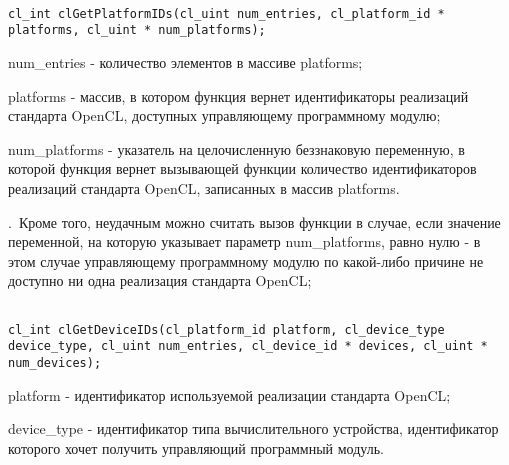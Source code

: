 	\begin{enumerate}



\begin{lstlisting}

cl_int clGetPlatformIDs(cl_uint num_entries, cl_platform_id * platforms, cl_uint * num_platforms);

\end{lstlisting}

		\openclend
		{
			\item num\_entries - количество элементов в массиве platforms;
			\item platforms - массив, в котором функция \openclfunc вернет идентификаторы реализаций стандарта OpenCL, доступных управляющему программному модулю;
			\item num\_platforms - указатель на целочисленную беззнаковую переменную, в которой функция \openclfunc вернет вызывающей функции количество идентификаторов реализаций стандарта OpenCL, записанных в массив platforms.
		}
		{\openclsuccess.~Кроме того, неудачным можно считать вызов функции \openclfunc в случае, если значение переменной, на которую указывает параметр num\_platforms, равно нулю - в этом случае управляющему программному модулю по какой-либо причине не доступно ни одна реализация стандарта OpenCL;}



\begin{lstlisting}

cl_int clGetDeviceIDs(cl_platform_id platform, cl_device_type device_type, cl_uint num_entries, cl_device_id * devices, cl_uint * num_devices);

\end{lstlisting}

		\openclend
		{
			\item platform - идентификатор используемой реализации стандарта OpenCL;
			\item device\_type - идентификатор типа вычислительного устройства, идентификатор которого хочет получить управляющий программный модуль.

}
\end{enumerate}
